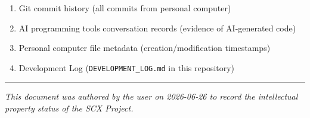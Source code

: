 \documentclass[
  12pt,
]{article}
\providecommand{\tightlist}{%
  \setlength{\itemsep}{0pt}\setlength{\parskip}{0pt}}
\begin{document}
\begin{enumerate}
\def\labelenumi{\arabic{enumi}.}
\tightlist
\item
  Git commit history (all commits from personal computer)
\item
  AI programming tools conversation records (evidence of AI-generated code)
\item
  Personal computer file metadata (creation/modification timestamps)
\item
  Development Log (\texttt{DEVELOPMENT\_LOG.md} in this repository)
\end{enumerate}

\begin{center}\rule{0.5\linewidth}{0.5pt}\end{center}

\emph{This document was authored by the user on 2026-06-26 to record the intellectual property status of the SCX Project.}
\end{document}

